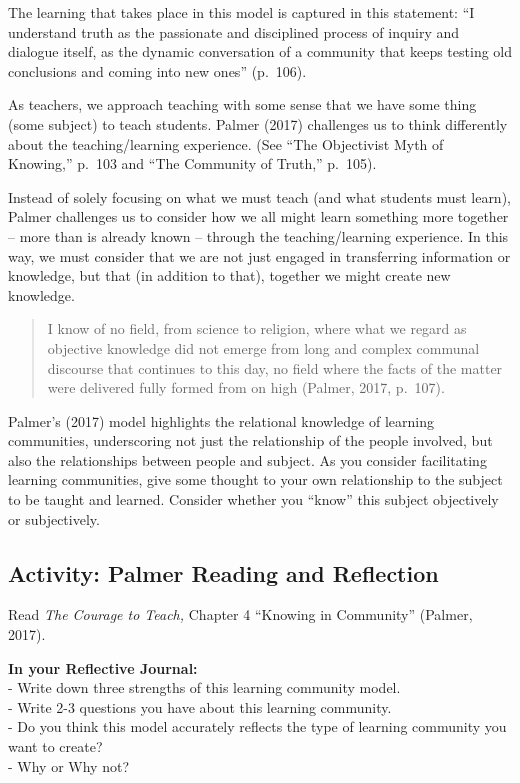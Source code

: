 \documentclass[
]{book}
\begin{document}
The learning that takes place in this model is captured in this statement: ``I understand truth as the passionate and disciplined process of inquiry and dialogue itself, as the dynamic conversation of a community that keeps testing old conclusions and coming into new ones'' (p.~106).

As teachers, we approach teaching with some sense that we have some thing (some subject) to teach students. Palmer (2017) challenges us to think differently about the teaching/learning experience. (See ``The Objectivist Myth of Knowing,'' p.~103 and ``The Community of Truth,'' p.~105).

Instead of solely focusing on what we must teach (and what students must learn), Palmer challenges us to consider how we all might learn something more together -- more than is already known -- through the teaching/learning experience. In this way, we must consider that we are not just engaged in transferring information or knowledge, but that (in addition to that), together we might create new knowledge.

\begin{quote}
I know of no field, from science to religion, where what we regard as objective knowledge did not emerge from long and complex communal discourse that continues to this day, no field where the facts of the matter were delivered fully formed from on high (Palmer, 2017, p.~107).
\end{quote}

Palmer's (2017) model highlights the relational knowledge of learning communities, underscoring not just the relationship of the people involved, but also the relationships between people and subject. As you consider facilitating learning communities, give some thought to your own relationship to the subject to be taught and learned. Consider whether you ``know'' this subject objectively or subjectively.

\hypertarget{activity-palmer-reading-and-reflection}{%
\subsection*{Activity: Palmer Reading and Reflection}\label{activity-palmer-reading-and-reflection}}

\begin{reflect}
Read \emph{The Courage to Teach,} Chapter 4 ``Knowing in Community'' (Palmer, 2017).

\textbf{In your Reflective Journal:}\\
- Write down three strengths of this learning community model.\\
- Write 2-3 questions you have about this learning community.\\
- Do you think this model accurately reflects the type of learning community you want to create?\\
- Why or Why not?
\end{reflect}
\end{document}
